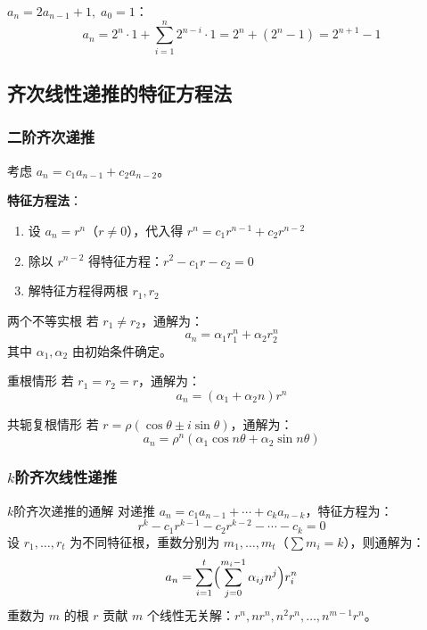 \begin{example}
\(a_n = 2a_{n-1}+1,\;a_0=1\)：
\[
a_n = 2^n\cdot 1 + \sum_{i=1}^{n} 2^{n-i}\cdot 1 = 2^n + (2^n-1) = 2^{n+1}-1
\]
\end{example}

\subsection{齐次线性递推的特征方程法}

\subsubsection{二阶齐次递推}

考虑 \(a_n = c_1 a_{n-1} + c_2 a_{n-2}\)。

\textbf{特征方程法}：
\begin{enumerate}
    \item 设 \(a_n = r^n\)（\(r\neq 0\)），代入得 \(r^n = c_1 r^{n-1} + c_2 r^{n-2}\)
    \item 除以 \(r^{n-2}\) 得特征方程：\(r^2 - c_1 r - c_2 = 0\)
    \item 解特征方程得两根 \(r_1,r_2\)
\end{enumerate}

\begin{myTheorem}{两个不等实根}
若 \(r_1 \neq r_2\)，通解为：
\[
a_n = \alpha_1 r_1^n + \alpha_2 r_2^n
\]
其中 \(\alpha_1,\alpha_2\) 由初始条件确定。
\end{myTheorem}

\begin{myTheorem}{重根情形}
若 \(r_1 = r_2 = r\)，通解为：
\[
a_n = (\alpha_1 + \alpha_2 n) r^n
\]
\end{myTheorem}

\begin{myTheorem}{共轭复根情形}
若 \(r = \rho(\cos\theta \pm i\sin\theta)\)，通解为：
\[
a_n = \rho^n(\alpha_1 \cos n\theta + \alpha_2 \sin n\theta)
\]
\end{myTheorem}

\subsubsection{\(k\)阶齐次线性递推}

\begin{myTheorem}{\(k\)阶齐次递推的通解}
对递推 \(a_n = c_1 a_{n-1} + \cdots + c_k a_{n-k}\)，特征方程为：
\[
r^k - c_1 r^{k-1} - c_2 r^{k-2} - \cdots - c_k = 0
\]
设 \(r_1,\dots,r_t\) 为不同特征根，重数分别为 \(m_1,\dots,m_t\)（\(\sum m_i = k\)），则通解为：
\[
a_n = \sum_{i=1}^{t} \Bigl(\sum_{j=0}^{m_i-1} \alpha_{ij} n^j\Bigr) r_i^n
\]
重数为 \(m\) 的根 \(r\) 贡献 \(m\) 个线性无关解：\(r^n, nr^n, n^2r^n, \dots, n^{m-1}r^n\)。
\end{myTheorem}

